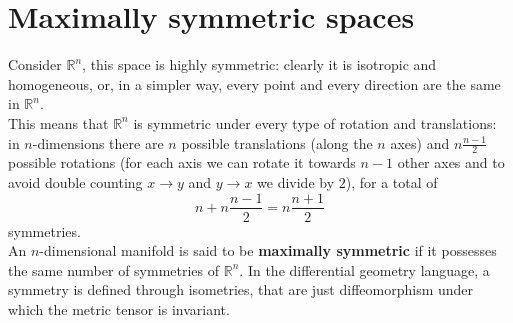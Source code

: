\appendix
\section{Maximally symmetric spaces}
Consider $\mathbb{R}^n$, this space is highly symmetric: clearly it is isotropic and homogeneous, or, in a simpler way, every point and every direction are the same in $\mathbb{R}^n$.\\
This means that $\mathbb{R}^n$ is symmetric under every type of rotation and translations: in $n$-dimensions there are $n$ possible translations (along the $n$ axes) and $n\frac{n-1}{2}$ possible rotations (for each axis we can rotate it towards $n-1$ other axes and to avoid double counting $x\rightarrow y$ and $y\rightarrow x$ we divide by $2$), for a total of $$n+n\frac{n-1}{2}=n\frac{n+1}{2}$$ symmetries.\\

An $n$-dimensional manifold is said to be \textbf{maximally symmetric} if it possesses the same number of symmetries of $\mathbb{R}^n$. In the differential geometry language, a symmetry is defined through isometries, that are just diffeomorphism under which the metric tensor is invariant. 